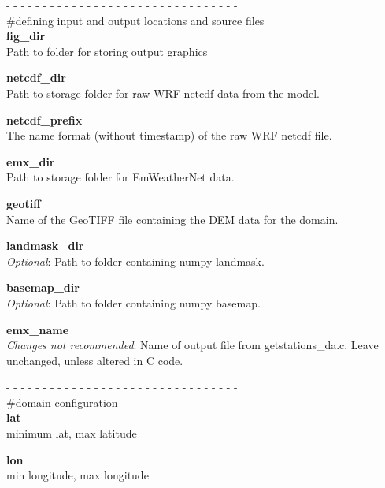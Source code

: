 \documentclass{article}
\begin{document}
\noindent- - - - - - - - - - - - - - - - - - - - - - - - - - - - - - - -\\
\noindent\#defining input and output locations and source files\\

\noindent \textbf{fig\_dir}\\
Path to folder for storing output graphics

\vspace{0.1cm}
\noindent \textbf{netcdf\_dir}\\
Path to storage folder for raw WRF netcdf data from the model. 

\vspace{0.1cm}
\noindent \textbf{netcdf\_prefix}\\
The name format (without timestamp) of the raw WRF netcdf file. 

\vspace{0.1cm}
\noindent \textbf{emx\_dir}\\
Path to storage folder for EmWeatherNet data. 

\vspace{0.1cm}
\noindent \textbf{geotiff}\\
Name of the GeoTIFF file containing the DEM data for the domain.  

\vspace{0.1cm}
\noindent \textbf{landmask\_dir}\\
\emph{Optional}: Path to folder containing numpy landmask. 

\vspace{0.1cm}
\noindent \textbf{basemap\_dir}\\
\emph{Optional}: Path to folder containing numpy basemap. 

\vspace{0.1cm}
\noindent \textbf{emx\_name}\\
\emph{Changes not recommended}: Name of output file from getstations\_da.c. Leave unchanged, unless altered in C code. 

\vspace{0.5cm}
\noindent- - - - - - - - - - - - - - - - - - - - - - - - - - - - - - - -\\
\noindent\#domain configuration\\

\noindent \textbf{lat}\\
\lbrack minimum lat, max latitude\rbrack

\vspace{0.1cm}
\noindent \textbf{lon}\\
\lbrack min longitude, max longitude\rbrack
\end{document}
